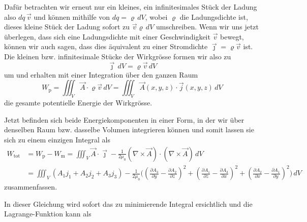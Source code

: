 Dafür betrachten wir erneut nur ein kleines, ein infinitesimales Stück der Ladung also $dq\,\vec{v}$ und können mithilfe von $dq = \varrho\,dV$, wobei $\varrho$ die Ladungsdichte ist, dieses kleine Stück der Ladung sofort zu $\vec{v}\varrho\,dV$ umschreiben.
Wenn wir uns jetzt überlegen, dass sich eine Ladungsdichte mit einer Geschwindigkeit $\vec{v}$ bewegt, können wir auch sagen, dass dies äquivalent zu einer Stromdichte $\vec{\jmath}=\varrho\vec{v}$ ist. 
Die kleinen bzw. infinitesimale Stücke der Wirkgrösse formen wir also zu \[\vec{\jmath}\,dV = \varrho\vec{v}\,dV\]
um und erhalten mit einer Integration über den ganzen Raum
\begin{equation}
	W_{\text{p}}
	= 
	\iiint_V \vec{A}\cdot\varrho\vec{v}\,dV
	=
	\iiint_V \vec{A}(x,y,z)\cdot\vec{j}(x,y,z)\,dV
\end{equation}
die gesamte potentielle Energie der Wirkgrösse.

Jetzt befinden sich beide Energiekomponenten in einer Form, in der wir über denselben Raum bzw. dasselbe Volumen integrieren können und somit lassen sie sich zu einem einzigen Integral als 
\begin{align*}
W_{\text{tot}} 
&=
W_{\text{p}} - W_{\text{m}}
=
\iiint_V \vec{A}\cdot\vec{\jmath}
- \frac{1}{2\mu_0}\left(\nabla\times\vec{A}\right)\cdot\left(\nabla\times\vec{A}\right)\, dV \\
&=
\iiint_V \left( A_1j_1 + A_2j_2 + A_3j_3\right) - 
 \frac{1}{2\mu_0}\biggl( 
 	\left( \frac{\partial A_3}{\partial y} -\frac{\partial A_2}{\partial z}\right)^2 
 + \left( \frac{\partial A_1}{\partial z} -\frac{\partial A_3}{\partial x}\right)^2
 + \left(\frac{\partial A_2}{\partial x} -\frac{\partial A_1}{\partial y} \right)^2   
 \biggr) \,dV
\end{align*}
zusammenfassen.

In dieser Gleichung wird sofort das zu minimierende Integral ersichtlich und die Lagrange-Funktion kann als 

	
